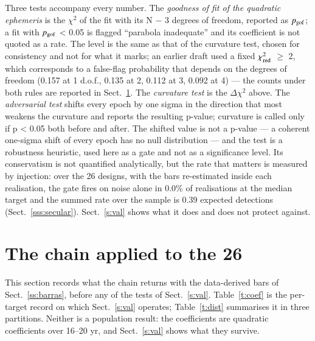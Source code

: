\documentclass{aa}
\begin{document}
Three tests accompany every number. The \textit{goodness of fit of the quadratic ephemeris} is the $\chi^2$ of the fit with its N $-$ 3 degrees of freedom, reported as $p_{\rm gof}$; a fit with $p_{\rm gof}$ < 0.05 is flagged ``parabola inadequate'' and its coefficient is not quoted as a rate. The level is the same as that of the curvature test, chosen for consistency and not for what it marks; an earlier draft used a fixed $\chi^2_{\rm red}$ $\ge$ 2, which corresponds to a false-flag probability that depends on the degrees of freedom (0.157 at 1 d.o.f., 0.135 at 2, 0.112 at 3, 0.092 at 4) --- the counts under both rules are reported in Sect.~\ref{s:res}. The \textit{curvature test} is the $\Delta\chi^2$ above. The \textit{adversarial test} shifts every epoch by one sigma in the direction that most weakens the curvature and reports the resulting p-value; curvature is called only if p < 0.05 both before and after. The shifted value is not a p-value --- a coherent one-sigma shift of every epoch has no null distribution --- and the test is a robustness heuristic, used here as a gate and not as a significance level. Its conservatism is not quantified analytically, but the rate that matters is measured by injection: over the 26 designs, with the bars re-estimated inside each realisation, the gate fires on noise alone in 0.0\% of realisations at the median target and the summed rate over the sample is 0.39 expected detections (Sect.~\ref{sss:secular}). Sect.~\ref{s:val} shows what it does and does not protect against.


\section{The chain applied to the 26}\label{s:res}
This section records what the chain returns with the data-derived bars of Sect.~\ref{ss:barras}, before any of the tests of Sect.~\ref{s:val}. Table~\ref{t:coef} is the per-target record on which Sect.~\ref{s:val} operates; Table~\ref{t:dist} summarises it in three partitions. Neither is a population result: the coefficients are quadratic coefficients over 16--20 yr, and Sect.~\ref{s:val} shows what they survive.
\end{document}
